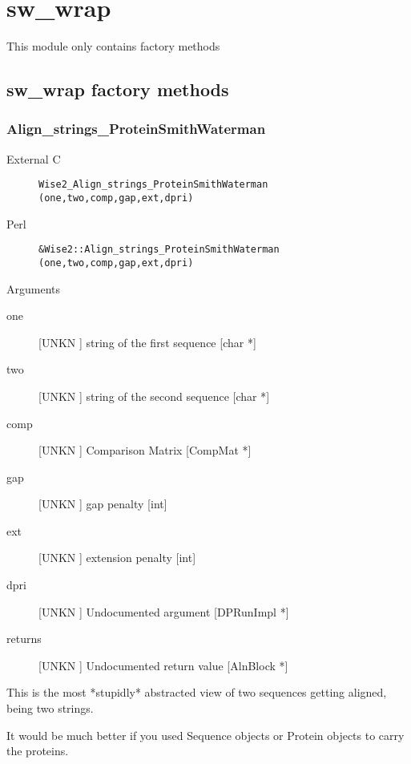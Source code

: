 \section{sw_wrap}
\label{module_sw_wrap}
This module only contains factory methods

\subsection{sw_wrap factory methods}
\subsubsection{Align_strings_ProteinSmithWaterman}
\begin{description}
\item[External C] {\tt Wise2_Align_strings_ProteinSmithWaterman (one,two,comp,gap,ext,dpri)}
\item[Perl] {\tt &Wise2::Align_strings_ProteinSmithWaterman (one,two,comp,gap,ext,dpri)}

\end{description}
Arguments
\begin{description}
\item[one] [UNKN ] string of the first sequence [char *]
\item[two] [UNKN ] string of the second sequence [char *]
\item[comp] [UNKN ] Comparison Matrix [CompMat *]
\item[gap] [UNKN ] gap penalty [int]
\item[ext] [UNKN ] extension penalty [int]
\item[dpri] [UNKN ] Undocumented argument [DPRunImpl *]
\item[returns] [UNKN ] Undocumented return value [AlnBlock *]
\end{description}
This is the most *stupidly* abstracted view of two sequences
getting aligned, being two strings.


It would be much better if you used Sequence objects or Protein
objects to carry the proteins.


